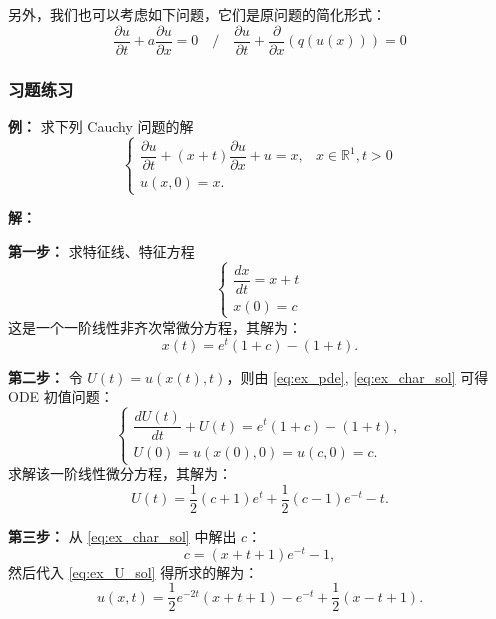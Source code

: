 \documentclass[12pt,a4paper]{ctexart}
\begin{document}
	另外，我们也可以考虑如下问题，它们是原问题的简化形式：
	\begin{equation}
		\frac{\partial u}{\partial t} + a \frac{\partial u}{\partial x} = 0 \quad \bigg/ \quad \frac{\partial u}{\partial t} + \frac{\partial}{\partial x}(q(u(x))) = 0
	\end{equation}
	
	\subsubsection{习题练习}
	\textbf{例：} 求下列 Cauchy 问题的解
	\begin{equation}
		\begin{cases}
			\dfrac{\partial u}{\partial t} + (x+t)\dfrac{\partial u}{\partial x} + u = x, & x \in \mathbb{R}^1, t > 0 \\[8pt]
			u(x,0) = x.
		\end{cases} \label{eq:ex_pde}
	\end{equation}
	
	\textbf{解：}
	
	\textbf{第一步：} 求特征线、特征方程
	\begin{equation}
		\begin{cases}
			\dfrac{dx}{dt} = x + t \\[6pt]
			x(0) = c
		\end{cases}
	\end{equation}
	这是一个一阶线性非齐次常微分方程，其解为：
	\begin{equation}
		x(t) = e^t(1+c) - (1+t). \label{eq:ex_char_sol}
	\end{equation}
	
	\textbf{第二步：} 令 $U(t) = u(x(t), t)$，则由 \eqref{eq:ex_pde}, \eqref{eq:ex_char_sol} 可得 ODE 初值问题：
	\begin{equation}
		\begin{cases}
			\dfrac{dU(t)}{dt} + U(t) = e^t(1+c) - (1+t), \\[8pt]
			U(0) = u(x(0),0) = u(c,0) = c.
		\end{cases}
	\end{equation}
	求解该一阶线性微分方程，其解为：
	\begin{equation}
		U(t) = \frac{1}{2}(c+1)e^t + \frac{1}{2}(c-1)e^{-t} - t. \label{eq:ex_U_sol}
	\end{equation}
	
	\textbf{第三步：} 从 \eqref{eq:ex_char_sol} 中解出 $c$：
	\begin{equation}
		c = (x+t+1)e^{-t} - 1,
	\end{equation}
	然后代入 \eqref{eq:ex_U_sol} 得所求的解为：
	\begin{equation}
		u(x,t) = \frac{1}{2}e^{-2t}(x+t+1) - e^{-t} + \frac{1}{2}(x-t+1).
	\end{equation}
\end{document}
